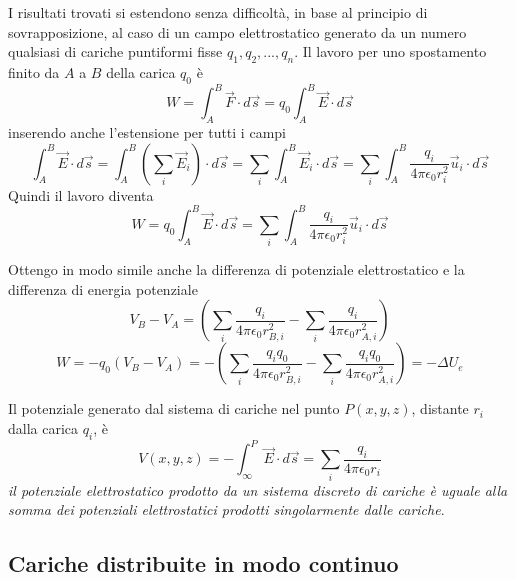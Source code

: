 \documentclass[class=book, crop=false, oneside, 12pt]{standalone}
\begin{document}
I risultati trovati si estendono senza difficoltà, in base al principio di sovrapposizione, al caso di un campo elettrostatico generato da un numero qualsiasi di cariche puntiformi fisse \(q_1, q_2, ... , q_n\). 
Il lavoro per uno spostamento finito da \(A\) a \(B\) della carica \(q_0\) è 
\begin{equation*}
    W = \int_A^B \overrightarrow{F} \cdot d \overrightarrow{s} = q_0 \int_A^B \overrightarrow{E} \cdot d \overrightarrow{s}
\end{equation*}
inserendo anche l'estensione per tutti i campi
\begin{equation*}
    \int_A^B \overrightarrow{E} \cdot d \overrightarrow{s} = \int_A^B \left(\sum_i \overrightarrow{E}_i \right) \cdot d \overrightarrow{s} = \sum_i \int_A^B \overrightarrow{E}_i \cdot d \overrightarrow{s} = \sum_i \int_A^B \frac{q_i}{4 \pi \epsilon_0 r_i^2}\overrightarrow{u}_i \cdot d \overrightarrow{s}
\end{equation*}
Quindi il lavoro diventa
\begin{equation}
    W = q_0 \int_A^B \overrightarrow{E} \cdot d \overrightarrow{s} = \sum_i \int_A^B \frac{q_i}{4 \pi \epsilon_0 r_i^2}\overrightarrow{u}_i \cdot d \overrightarrow{s}
\end{equation}

Ottengo in modo simile anche la differenza di potenziale elettrostatico e la differenza di energia potenziale
\begin{equation}
    V_B - V_A = \left(\sum_i \frac{q_i}{4 \pi \epsilon_0 r_{B,i}^2} - \sum_i \frac{q_i}{4 \pi \epsilon_0 r_{A,i}^2}\right)
\end{equation}
\begin{equation}
    W = - q_0 \left( V_B - V_A \right) = - \left(\sum_i \frac{q_i q_0}{4 \pi \epsilon_0 r_{B,i}^2} - \sum_i \frac{q_i q_0}{4 \pi \epsilon_0 r_{A,i}^2}\right) = - \Delta U_e
\end{equation}

Il potenziale generato dal sistema di cariche nel punto \(P (x, y, z)\), distante \(r_i\) dalla carica \(q_i\), è 
\begin{equation}
    V(x,y,z) = - \int_{\infty}^P \overrightarrow{E} \cdot d \overrightarrow{s} = \sum_i \frac{q_i}{4 \pi \epsilon_0 r_i}
\end{equation}
\emph{il potenziale elettrostatico prodotto da un sistema discreto di cariche è uguale alla somma dei potenziali elettrostatici prodotti singolarmente dalle cariche}.

\subsection{Cariche distribuite in modo continuo}
\end{document}
